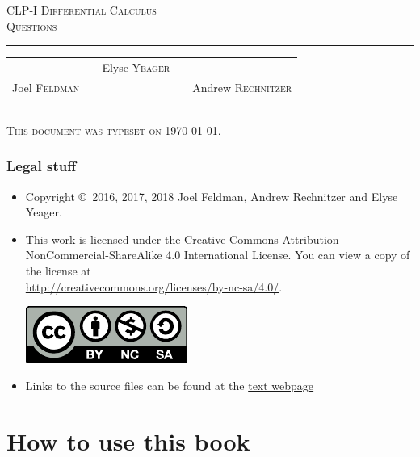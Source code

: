 \documentclass[12pt,letterpaper]{book}
\begin{document}
\begin{titlepage}
\begin{center}
\textsc{\LARGE
CLP-I Differential Calculus\\[2ex]
Questions
}\\[2ex]

\vspace{5ex}
\hrule
\vspace{5ex}

\begin{tabular}{lcccr}
&& \large Elyse \textsc{Yeager} \\[3ex]
 Joel \textsc{Feldman}
&\quad & &\quad&
Andrew \textsc{Rechnitzer}
\end{tabular}

\end{center}
\vspace{2ex}
\hrule

\vfill
\textsc{This document was typeset on \today.}
\end{titlepage}

\subsection*{Legal stuff}
\begin{itemize}
 \item Copyright \copyright\ 2016, 2017, 2018 Joel Feldman, Andrew Rechnitzer and Elyse Yeager.

\item This work is licensed under the
Creative Commons Attribution-NonCommercial-ShareAlike 4.0 International
License. You can view a copy of the license at \\
\url{http://creativecommons.org/licenses/by-nc-sa/4.0/}.
\begin{center}
 \includegraphics{by-nc-sa.pdf}
\end{center}


\item Links to the source files can be found at the \href{http://www.math.ubc.ca/~CLP/index.html}{text webpage}
\end{itemize}


\frontmatter

\chapter{How to use this book}

\end{document}
